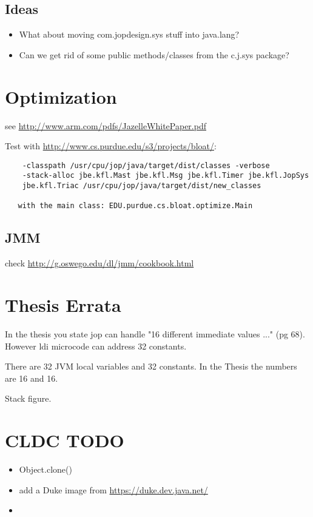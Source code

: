 \documentclass[a4paper,12pt]{scrartcl}
\begin{document}
\subsection{Ideas}

\begin{itemize}
  \item What about moving com.jopdesign.sys stuff into java.lang?
  \item Can we get rid of some public methods/classes from the
      c.j.sys package?
\end{itemize}



\section{Optimization}

see \url{http://www.arm.com/pdfs/JazelleWhitePaper.pdf}

Test with \url{http://www.cs.purdue.edu/s3/projects/bloat/}:

\begin{verbatim}
    -classpath /usr/cpu/jop/java/target/dist/classes -verbose
    -stack-alloc jbe.kfl.Mast jbe.kfl.Msg jbe.kfl.Timer jbe.kfl.JopSys
    jbe.kfl.Triac /usr/cpu/jop/java/target/dist/new_classes

   with the main class: EDU.purdue.cs.bloat.optimize.Main
\end{verbatim}

\subsection{JMM}

check \url{http://g.oswego.edu/dl/jmm/cookbook.html}

\section{Thesis Errata}

In the thesis you state jop can handle "16 different immediate
values ..." (pg 68). However ldi microcode can address 32 constants.

There are 32 JVM local variables and 32 constants. In the Thesis the
numbers are 16 and 16.

Stack figure.

\section{CLDC TODO}

\begin{itemize}
    \item Object.clone()
    \item add a Duke image from \url{https://duke.dev.java.net/}
    \item
\end{itemize}
\end{document}
